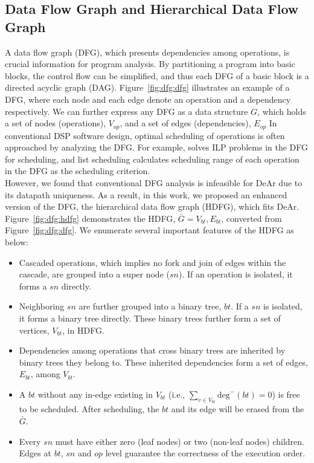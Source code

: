 \subsection{Data Flow Graph and Hierarchical Data Flow Graph}
\label{sec:hdfg}
A data flow graph (DFG), which presents dependencies among operations, is crucial information for program analysis.
By partitioning a program into basic blocks, the control flow can be simplified, and thus each DFG of a basic block is a directed acyclic graph (DAG).
Figure~\ref{fig:dfg:dfg} illustrates an example of a DFG, where each node and each edge denote an operation and a dependency respectively.
We can further express any DFG as a data structure $G$, which holds a set of nodes (operations), $V_{op}$, and a set of edges (dependencies), $E_{op}$
In conventional DSP software design, optimal scheduling of operations is often approached by analyzing the DFG.
For example, \cite{dsplite} solves ILP problems \cite{ilp} in the DFG for scheduling, 
and list scheduling \cite{list} calculates scheduling range of each operation in the DFG as the scheduling criterion. 
\\\indent
However, we found that conventional DFG analysis is infeasible for DeAr due to its datapath uniqueness.
As a result, in this work, we proposed an enhanced version of the DFG, the hierarchical data flow graph (HDFG), which fits DeAr.
Figure~\ref{fig:dfg:hdfg} demonstrates the HDFG, $\bar{G} = {V_{bt}, E_{bt}}$, converted from Figure~\ref{fig:dfg:dfg}.
We enumerate several important features of the HDFG as below: 
\begin{itemize}
    \item Cascaded operations, which implies no fork and join of edges within the cascade, are grouped into a super node ($sn$). 
        If an operation is isolated, it forms a $sn$ directly.
    \item Neighboring $sn$ are further grouped into a binary tree, $bt$.
        If a $sn$ is isolated, it forms a binary tree directly.
        These binary trees further form a set of vertices, $V_{bt}$, in HDFG.
    \item Dependencies among operations that cross binary trees are inherited by binary trees they belong to.
        These inherited dependencies form a set of edges, $E_{bt}$, among $V_{bt}$.
    \item A $bt$ without any in-edge existing in $V_{bt}$ (i.e., $\sum_{v \in V_{bt}}\textrm{deg}^-(bt) = 0$) is free to be scheduled. 
        After scheduling, the $bt$ and its edge will be erased from the $\bar{G}$.
    \item Every $sn$ must have either zero (leaf nodes) or two (non-leaf nodes) children.
        Edges at $bt$, $sn$ and $op$ level guarantee the correctness of the execution order.
\end{itemize}

